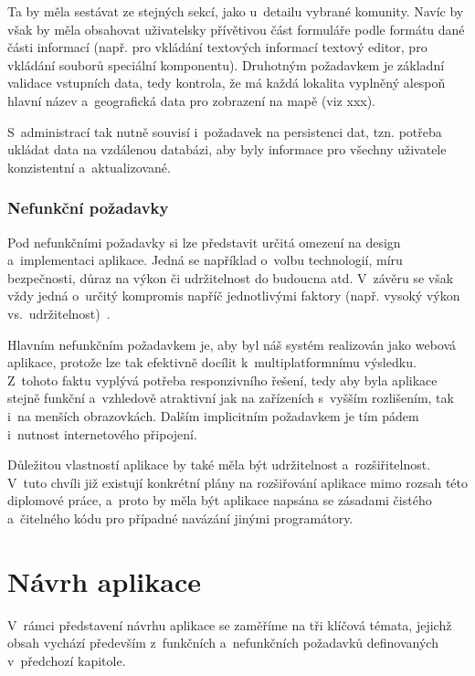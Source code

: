 Ta by měla sestávat ze stejných sekcí, jako u~detailu vybrané komunity. Navíc by však by měla obsahovat uživatelsky přívětivou část formuláře podle formátu dané části informací (např. pro vkládání textových informací textový editor, pro vkládání souborů speciální komponentu). Druhotným požadavkem je základní validace vstupních data, tedy kontrola, že má každá lokalita vyplněný alespoň hlavní název a~geografická data pro zobrazení na mapě (viz xxx).

S~administrací tak nutně souvisí i~požadavek na persistenci dat, tzn. potřeba ukládat data na vzdálenou databázi, aby byly informace pro všechny uživatele konzistentní a~aktualizované.

\hypertarget{nefunkux10dnuxed-poux17eadavky}{%
\subsection{Nefunkční požadavky}\label{nefunkux10dnuxed-poux17eadavky}}

Pod nefunkčními požadavky si lze představit určitá omezení na design a~implementaci aplikace. Jedná se například o~volbu technologií, míru bezpečnosti, důraz na výkon či udržitelnost do budoucna atd. V~závěru se však vždy jedná o~určitý kompromis napříč jednotlivými faktory (např. vysoký výkon vs.~udržitelnost)~\parencite{Gorton2006}.

Hlavním nefunkčním požadavkem je, aby byl náš systém realizován jako webová aplikace, protože lze tak efektivně docílit k~multiplatformnímu výsledku. Z~tohoto faktu vyplývá potřeba responzivního řešení, tedy aby byla aplikace stejně funkční a~vzhledově atraktivní jak na zařízeních s~vyšším rozlišením, tak i~na menších obrazovkách. Dalším implicitním požadavkem je tím pádem i~nutnost internetového připojení.

Důležitou vlastností aplikace by také měla být udržitelnost a~rozšiřitelnost. V~tuto chvíli již existují konkrétní plány na rozšiřování aplikace mimo rozsah této diplomové práce, a~proto by měla být aplikace napsána se zásadami čistého a~čitelného kódu pro případné navázání jinými programátory.

\hypertarget{nuxe1vrh-aplikace}{%
\chapter{Návrh aplikace}\label{nuxe1vrh-aplikace}}

V~rámci představení návrhu aplikace se zaměříme na tři klíčová témata, jejichž obsah vychází především z~funkčních a~nefunkčních požadavků definovaných v~předchozí kapitole.

